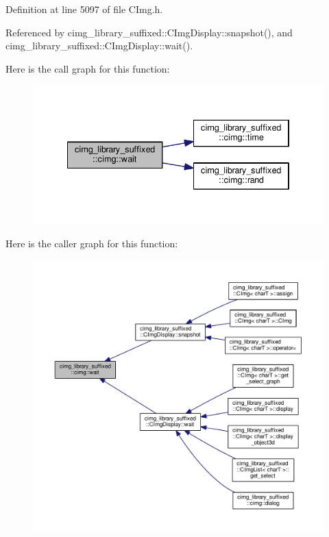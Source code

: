Definition at line 5097 of file C\+Img.\+h.



Referenced by cimg\+\_\+library\+\_\+suffixed\+::\+C\+Img\+Display\+::snapshot(), and cimg\+\_\+library\+\_\+suffixed\+::\+C\+Img\+Display\+::wait().

Here is the call graph for this function\+:
\nopagebreak
\begin{figure}[H]
\begin{center}
\leavevmode
\includegraphics[width=334pt]{d4/d9b/namespacecimg__library__suffixed_1_1cimg_a8431f8cf0989f40df3b6ac7d9dc90abd_cgraph}
\end{center}
\end{figure}
Here is the caller graph for this function\+:
\nopagebreak
\begin{figure}[H]
\begin{center}
\leavevmode
\includegraphics[width=350pt]{d4/d9b/namespacecimg__library__suffixed_1_1cimg_a8431f8cf0989f40df3b6ac7d9dc90abd_icgraph}
\end{center}
\end{figure}
\mbox{\label{namespacecimg__library__suffixed_1_1cimg_acfd3624d72ed7f79c82ec45646c685e7}} 
